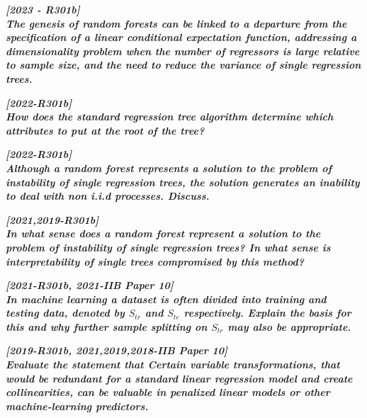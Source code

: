 \documentclass[DIV=14,titlepage=false]{scrreprt}
\begin{document}
\vspace{5pt}

\textbf{\textit{[2023 - R301b] \\
The genesis of random forests can be linked to a departure from the specification of a linear conditional expectation function, addressing a dimensionality problem when the number of regressors is large relative to sample size, and the need to reduce the variance of single regression trees.}}

\vspace{5pt}

\textbf{\textit{[2022-R301b] \\
 How does the standard regression tree algorithm determine which attributes to put at the root of the tree?}}

\vspace{5pt}

\textbf{\textit{[2022-R301b] \\
 Although a random forest represents a solution to the problem of instability of single regression trees, the solution generates an inability to deal with non i.i.d processes. Discuss.}}

\vspace{5pt}

\textbf{\textit{[2021,2019-R301b] \\
 In what sense does a random forest represent a solution to the problem of instability of single regression trees? In what sense is interpretability of single trees compromised by this method?}}

\vspace{5pt}

\textbf{\textit{[2021-R301b, 2021-IIB Paper 10] \\
 In machine learning a dataset is often divided into training and testing data, denoted by $S_{tr}$ and $S_{te}$ respectively. Explain the basis for this and why further sample splitting on $S_{tr}$ may also be appropriate.}}

\vspace{5pt}

\textbf{\textit{[2019-R301b, 2021,2019,2018-IIB Paper 10] \\
 Evaluate the statement that Certain variable transformations, that would be redundant for a standard linear regression model and create collinearities, can be valuable in penalized linear models or other machine-learning predictors.}}

\vspace{5pt}
\end{document}

